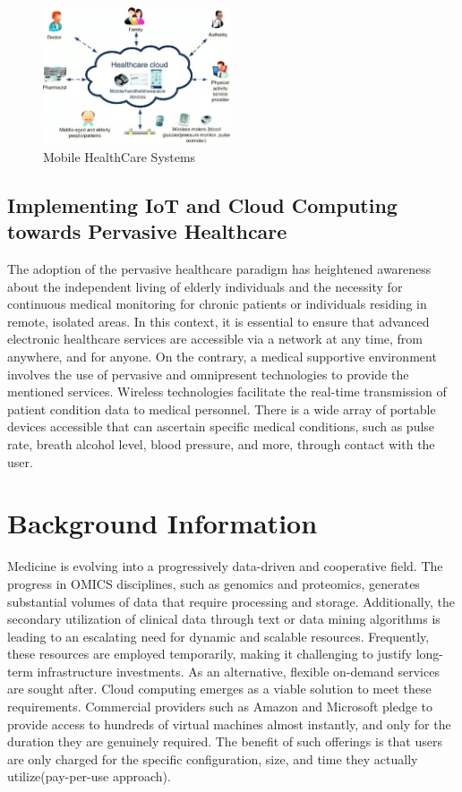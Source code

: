 \documentclass{article}
\begin{document}
\begin{figure}[H]
\centering
\includegraphics[width=0.5\textwidth]{images/mob.png}
\caption{\label{fig1}Mobile HealthCare Systems}
\end{figure}


\subsection{Implementing IoT and Cloud Computing towards Pervasive Healthcare} The adoption of the pervasive healthcare paradigm has heightened awareness about the independent living of elderly individuals and the necessity for continuous medical monitoring for chronic patients or individuals residing in remote, isolated areas.
 In this context, it is essential to ensure that advanced electronic healthcare services are accessible via a network at any time, from anywhere, and for anyone. 
On the contrary, a medical supportive environment involves the use of pervasive and omnipresent technologies to provide the mentioned services. Wireless technologies facilitate the real-time transmission of patient condition data to medical personnel.
There is a wide array of portable devices accessible that can ascertain specific medical conditions, such as pulse rate, breath alcohol level, blood pressure, and more, through contact with the user.

\section{Background Information}

Medicine is evolving into a progressively data-driven and cooperative field. The progress in OMICS disciplines, such as genomics and proteomics, generates substantial volumes of data that require processing and storage. Additionally, the secondary utilization of clinical data through text or data mining algorithms is leading to an escalating need for dynamic and scalable resources.
Frequently, these resources are employed temporarily, making it challenging to justify long-term infrastructure investments. As an alternative, flexible on-demand services are sought after. Cloud computing emerges as a viable solution to meet these requirements. Commercial providers such as Amazon and Microsoft pledge to provide access to hundreds of virtual machines almost instantly, and only for the duration they are genuinely required. The benefit of such offerings is that users are only charged for the specific configuration, size, and time they actually utilize(pay-per-use approach).
\end{document}
